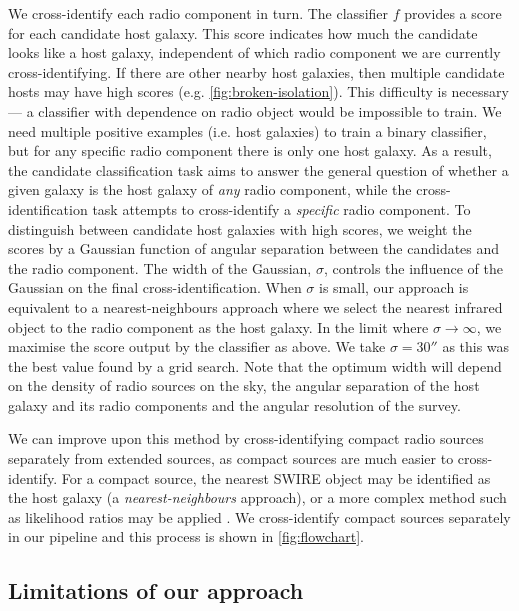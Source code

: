 \documentclass[fleqn,usenatbib,usedcolumn]{mnras}
\newcommand{\edited}[1]{#1}
\begin{document}
    \edited{We cross-identify each radio component in turn. The classifier $f$
    provides a score for each candidate host galaxy. This score indicates how
    much the candidate looks like a host galaxy, independent of which radio
    component we are currently cross-identifying. If there are other nearby host
    galaxies, then multiple candidate hosts may have high scores (e.g.
    \autoref{fig:broken-isolation}). This difficulty is necessary --- a classifier
    with dependence on radio object would be impossible to train. We
    need multiple positive examples (i.e. host galaxies) to train a binary classifier, but
    for any specific radio component there is only one host galaxy. As a
    result, the candidate classification task aims to answer the general question
    of whether a given galaxy is the host galaxy of \emph{any} radio
    component, while the cross-identification task attempts to cross-identify
    a \emph{specific} radio component. To distinguish between candidate host
    galaxies with high scores, we weight the scores by a Gaussian function of
    angular separation between the candidates and the radio component.} The
    width of the Gaussian, $\sigma$, controls the influence of the Gaussian on
    the final cross-identification. When $\sigma$ is small, our approach is
    equivalent to a nearest-neighbours approach where we select the nearest
    infrared object to the radio component as the host galaxy. In the limit
    where $\sigma \to \infty$, we maximise the score output by the
    classifier as above. We take $\sigma = 30''$ as this was the best value
    found by a grid search. \edited{Note that the optimum width will depend on
    the density of radio sources on the sky, the angular separation of the
    host galaxy and its radio components and the angular resolution of the survey.}

    \edited{We can improve upon this method by cross-identifying compact radio sources
    separately from extended sources, as compact sources are much easier to
    cross-identify. For a compact source, the nearest SWIRE object may be
    identified as the host galaxy (a \emph{nearest-neighbours} approach), or a
    more complex method such as likelihood ratios may be applied
    \citep[see][]{weston18lrpy}. We cross-identify compact sources separately
    in our pipeline and this process is shown in \autoref{fig:flowchart}.}

  \subsection{Limitations of our approach}
    \label{sec:limitations}
\end{document}
